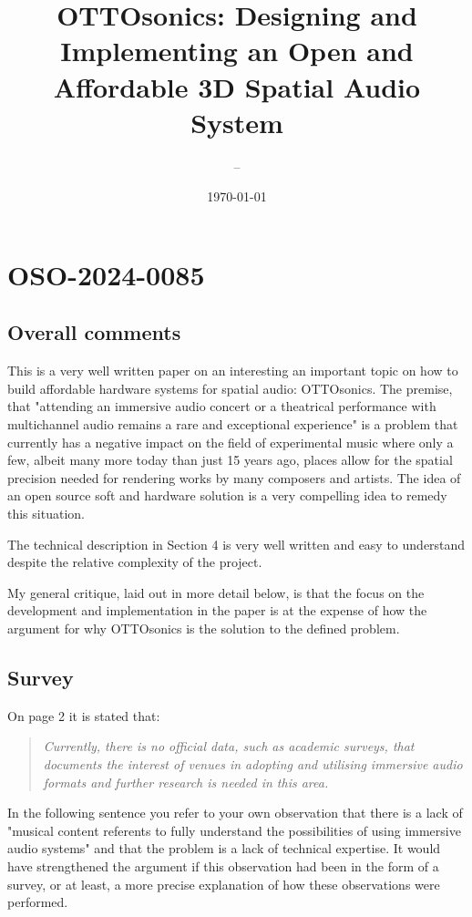 \documentclass[11pt]{article}
\author{--}
\date{\today}
\title{OTTOsonics: Designing and Implementing an Open and Affordable 3D Spatial Audio System}
\begin{document}
\maketitle
\renewcommand\familydefault{\sfdefault}
\section*{OSO-2024-0085}
\label{sec:org33cc9bf}
\subsection*{Overall comments}
\label{sec:orgcd8d9f8}

This is a very well written paper on an interesting an important topic on how to build affordable hardware systems for spatial audio: OTTOsonics. The premise, that "attending an immersive audio concert or a theatrical performance with multichannel audio remains a rare and exceptional experience" is a problem that currently has a negative impact on the field of experimental music where only a few, albeit many more today than just 15 years ago, places allow for the spatial precision needed for rendering works by many composers and artists. The idea of an open source soft and hardware solution is a very compelling idea to remedy this situation.

The technical description in Section 4 is very well written and easy to understand despite the relative complexity of the project.

My general critique, laid out in more detail below, is that the focus on the development and implementation in the paper is at the expense of how the argument for why OTTOsonics is the solution to the defined problem.
\subsection*{Survey}
\label{sec:org6411ddb}
On page 2 it is stated that:

\begin{quote}
\emph{Currently, there is no official data, such as academic surveys, that documents the interest of
venues in adopting and utilising immersive audio formats and further research is needed in
this area.}
\end{quote}
In the following sentence you refer to your own observation that there is a lack of "musical content referents to fully understand the possibilities of using immersive audio systems" and that the problem is a lack of technical expertise. It would have strengthened the argument if this observation had been in the form of a survey, or at least, a more precise explanation of how these observations were performed.
\end{document}
